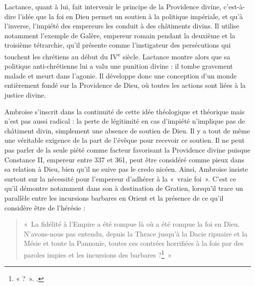 \bigskip

Lactance, quant à lui, fait intervenir le principe de la Providence divine, c'est-à-dire l’idée que la foi en Dieu permet un soutien à la politique impériale, et qu’à l’inverse, l’impiété des empereurs les conduit à des châtiments divins. Il utilise notamment l’exemple de Galère, empereur romain pendant la deuxième et la troisième tétrarchie, qu’il présente comme l’instigateur des persécutions qui touchent les chrétiens au début du IV\textsuperscript{e} siècle. Lactance montre alors que sa politique anti-chrétienne lui a valu une punition divine : il tombe gravement malade et meurt dans l’agonie. Il développe donc une conception d’un monde entièrement fondé sur la Providence de Dieu, où toutes les actions sont liées à la justice divine.

\bigskip

Ambroise s’inscrit dans la continuité de cette idée théologique et théorique mais n’est pas aussi radical : la perte de légitimité en cas d’impiété n’implique pas de châtiment divin, simplement une absence de soutien de Dieu. Il y a tout de même une véritable exigence de la part de l'évêque pour recevoir ce soutien. Il ne peut pas parler de la seule piété comme facteur favorisant la Providence divine puisque Constance II, empereur entre 337 et 361, peut être considéré comme pieux dans sa relation à Dieu, bien qu’il ne suive pas le credo nicéen. Ainsi, Ambroise insiste surtout sur la nécessité pour l'empereur d'adhérer à la «~vraie foi~». C'est ce qu'il démontre notamment dans son  à destination de Gratien, lorsqu'il trace un parallèle entre les incursions barbares en Orient et la présence de ce qu'il considère être de l'hérésie :

\bigskip

\begin{quote}
«~La fidélité à l’Empire a été rompue là où a été rompue la foi en Dieu. N’avons-nous pas entendu, depuis la Thrace jusqu’à la Dacie ripuaire et la Mésie et toute la Pannonie, toutes ces contrées horrifiées à la fois par des paroles impies et les incursions des barbares ?\footnote{« ?~». \cite[\nopp II, 16, 140]{ambroise_csel_78}.}~»
\end{quote}

\bigskip

